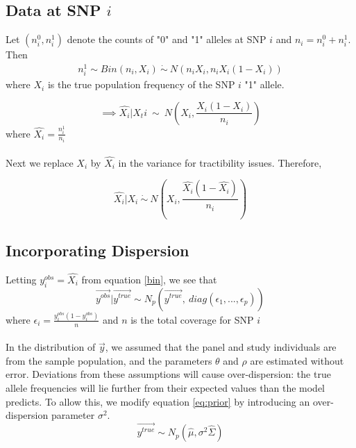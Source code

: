 \documentclass[10pt,a4paper,draft]{article}
\begin{document}
\iffalse
The distribution of $\{y_j: j \neq t\}$ given the test SNP,
\begin{equation}
\{y_i: i \neq t\} | y_t \sim N_{p-1}(\bar{\mu}, \bar{\Sigma}) \label{cond}
\end{equation}
where
\begin{align*}
\bar{\mu} = \vec{\mu_{i \neq t}} + \Sigma_{i \neq t, t}\frac{1}{\sigma_t^2}(y_t-\mu_{t}) 
\end{align*}
and
\begin{align*}
\hat{\Sigma} = \Sigma_{i \neq t, i \neq t} - \Sigma_{i \neq t, t}\frac{1}{\sigma_t^2}\Sigma_{t, i \neq t}
\end{align*}
\fi

\subsection{Data at SNP $i$}
Let $(n_i^0, n_i^1)$ denote the counts of "0" and "1" alleles at SNP $i$ and $n_i = n_i^0 + n_i^1$. Then 
\begin{align*}
n_i^1 \sim Bin(n_i, X_i) \ \dot{\sim}  \ N(n_iX_i, n_iX_i(1-X_i)) \label{eq:napprox}
\end{align*}
where $X_i$ is the true population frequency of the SNP $i$ "1" allele. 


\begin{equation}
\implies  \hat{X_i} | X_ti \ \sim \ N(X_i, \frac{X_i(1-X_i)}{n_i})
\end{equation}
where $\hat{X_i} = \frac{n_i^1}{n_i}$ \\
\\
Next we replace $X_i$ by $\hat{X_i}$ in the variance for tractibility issues. Therefore,

\begin{equation}
\hat{X_i} | X_i \ \dot{\sim} \ N(X_i, \frac{\hat{X_i}(1-\hat{X_i})}{n_i}) \label{bin}
\end{equation}


\subsection{Incorporating Dispersion}

Letting $y^{obs}_i = \hat{X_i}$ from equation \ref{bin}, we see that
\begin{equation}
\vec{y^{obs}} | \vec{y^{true}} \sim N_p(\vec{y^{true}}, \ diag(\epsilon_1,...,\epsilon_p))
\end{equation}
where $\epsilon_i = \frac{y^{obs}_i (1-y^{obs}_i)}{n}$ and $n$ is the total coverage for SNP $i$ \\
\\
In the distribution of $\vec{y}$, we assumed that the panel and study individuals are from the sample population, and the parameters $\theta$ and $\rho$ are estimated without error. Deviations from these assumptions will cause over-dispersion: the true allele frequencies will lie further from their expected values than the model predicts. To allow this, we modify equation \ref{eq:prior} by introducing an over-dispersion parameter $\sigma^2$.
\begin{equation}
\vec{y^{true}} \sim N_p(\hat{\mu}, \sigma^2\hat{\Sigma})
\end{equation}
\end{document}
